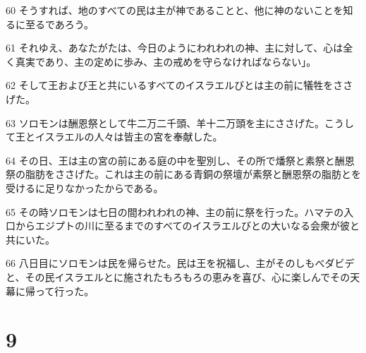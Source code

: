 \par 60 そうすれば、地のすべての民は主が神であることと、他に神のないことを知るに至るであろう。
\par 61 それゆえ、あなたがたは、今日のようにわれわれの神、主に対して、心は全く真実であり、主の定めに歩み、主の戒めを守らなければならない」。
\par 62 そして王および王と共にいるすべてのイスラエルびとは主の前に犠牲をささげた。
\par 63 ソロモンは酬恩祭として牛二万二千頭、羊十二万頭を主にささげた。こうして王とイスラエルの人々は皆主の宮を奉献した。
\par 64 その日、王は主の宮の前にある庭の中を聖別し、その所で燔祭と素祭と酬恩祭の脂肪をささげた。これは主の前にある青銅の祭壇が素祭と酬恩祭の脂肪とを受けるに足りなかったからである。
\par 65 その時ソロモンは七日の間われわれの神、主の前に祭を行った。ハマテの入口からエジプトの川に至るまでのすべてのイスラエルびとの大いなる会衆が彼と共にいた。
\par 66 八日目にソロモンは民を帰らせた。民は王を祝福し、主がそのしもべダビデと、その民イスラエルとに施されたもろもろの恵みを喜び、心に楽しんでその天幕に帰って行った。

\chapter{9}

